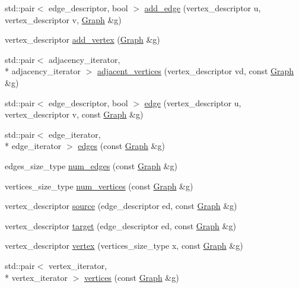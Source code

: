 \begin{DoxyCompactItemize}
\item 
std\-::pair$<$ edge\-\_\-descriptor, bool $>$ \hyperlink{classGraph_a21aaff00ca2ef2f86932f4f4803adbd9}{add\-\_\-edge} (vertex\-\_\-descriptor u, vertex\-\_\-descriptor v, \hyperlink{classGraph}{Graph} \&g)
\item 
vertex\-\_\-descriptor \hyperlink{classGraph_a460812cc36de1f018d533425648cd957}{add\-\_\-vertex} (\hyperlink{classGraph}{Graph} \&g)
\item 
std\-::pair$<$ adjacency\-\_\-iterator, \\*
adjacency\-\_\-iterator $>$ \hyperlink{classGraph_ab6f3b1c708605357432183be7483c949}{adjacent\-\_\-vertices} (vertex\-\_\-descriptor vd, const \hyperlink{classGraph}{Graph} \&g)
\item 
std\-::pair$<$ edge\-\_\-descriptor, bool $>$ \hyperlink{classGraph_ac71261875661196767a4727426720e87}{edge} (vertex\-\_\-descriptor u, vertex\-\_\-descriptor v, const \hyperlink{classGraph}{Graph} \&g)
\item 
std\-::pair$<$ edge\-\_\-iterator, \\*
edge\-\_\-iterator $>$ \hyperlink{classGraph_a9d595e6a5ba50cc48612a97ebb08c423}{edges} (const \hyperlink{classGraph}{Graph} \&g)
\item 
edges\-\_\-size\-\_\-type \hyperlink{classGraph_a8762ff8f5b09fea3fdcfb92c2648336e}{num\-\_\-edges} (const \hyperlink{classGraph}{Graph} \&g)
\item 
vertices\-\_\-size\-\_\-type \hyperlink{classGraph_a58495c0a2630da064db06001bbee4b83}{num\-\_\-vertices} (const \hyperlink{classGraph}{Graph} \&g)
\item 
vertex\-\_\-descriptor \hyperlink{classGraph_abeea1d6e4e84c501f639fb547f46a732}{source} (edge\-\_\-descriptor ed, const \hyperlink{classGraph}{Graph} \&g)
\item 
vertex\-\_\-descriptor \hyperlink{classGraph_a5faf1143ace31bbc5e269a15a1b73829}{target} (edge\-\_\-descriptor ed, const \hyperlink{classGraph}{Graph} \&g)
\item 
vertex\-\_\-descriptor \hyperlink{classGraph_aff7a5c6c81aa92f220fc0920cfc4a23d}{vertex} (vertices\-\_\-size\-\_\-type x, const \hyperlink{classGraph}{Graph} \&g)
\item 
std\-::pair$<$ vertex\-\_\-iterator, \\*
vertex\-\_\-iterator $>$ \hyperlink{classGraph_a8af8c02507f2320f17008c3d7e7a471c}{vertices} (const \hyperlink{classGraph}{Graph} \&g)
\end{DoxyCompactItemize}


